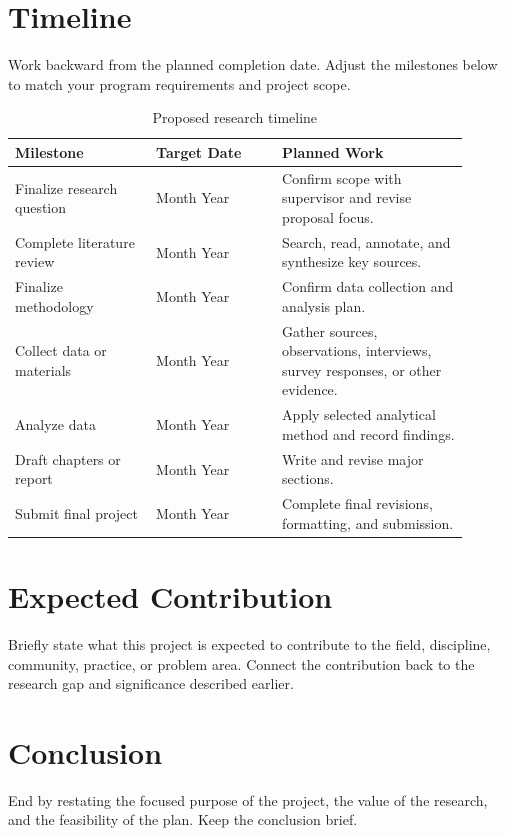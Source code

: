 \documentclass[12pt]{article}
\begin{document}
\section{Timeline}

Work backward from the planned completion date. Adjust the milestones below to
match your program requirements and project scope.

\begin{table}[h]
\centering
\caption{Proposed research timeline}
\begin{tabular}{p{0.28\linewidth} p{0.25\linewidth} p{0.37\linewidth}}
\toprule
\textbf{Milestone} & \textbf{Target Date} & \textbf{Planned Work} \\
\midrule
Finalize research question & Month Year & Confirm scope with supervisor and revise proposal focus. \\
Complete literature review & Month Year & Search, read, annotate, and synthesize key sources. \\
Finalize methodology & Month Year & Confirm data collection and analysis plan. \\
Collect data or materials & Month Year & Gather sources, observations, interviews, survey responses, or other evidence. \\
Analyze data & Month Year & Apply selected analytical method and record findings. \\
Draft chapters or report & Month Year & Write and revise major sections. \\
Submit final project & Month Year & Complete final revisions, formatting, and submission. \\
\bottomrule
\end{tabular}
\end{table}

\section{Expected Contribution}

Briefly state what this project is expected to contribute to the field,
discipline, community, practice, or problem area. Connect the contribution back
to the research gap and significance described earlier.

\section{Conclusion}

End by restating the focused purpose of the project, the value of the research,
and the feasibility of the plan. Keep the conclusion brief.

\printbibliography
\end{document}
